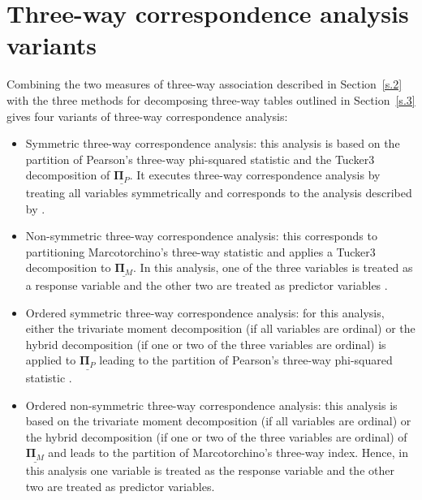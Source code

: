 \section{Three-way correspondence analysis variants}
\label{s.4}


Combining the two measures of three-way association described in Section~\ref{s.2} with the three methods for decomposing three-way tables outlined in Section~\ref{s.3} gives four variants of three-way correspondence analysis: 
\begin{itemize}
	\item Symmetric three-way correspondence analysis: this analysis is based on the partition of Pearson's three-way phi-squared statistic and the Tucker3 decomposition of $\underline{\bm{\Pi}_{P}}$. It executes three-way correspondence analysis by treating all variables symmetrically and corresponds to the analysis described by \cite{carkro96}. 
	\item Non-symmetric three-way correspondence analysis: this corresponds to partitioning Marcotorchino's three-way statistic and applies a Tucker3 decomposition to $\underline{\bm{\Pi}_{M}}$. In this analysis, one of the three variables is treated as a response variable and the other two are treated as predictor variables \citep{lom96}. 
	\item Ordered symmetric three-way correspondence analysis: for this analysis, either the trivariate moment decomposition (if all variables are ordinal) or the hybrid decomposition (if one or two of the three variables are ordinal) is applied to $\underline{\bm{\Pi}_{P}}$ leading to the partition of Pearson's three-way phi-squared statistic \citep{lombehkro21}. 
	\item Ordered non-symmetric three-way correspondence analysis: this analysis is based on the trivariate moment decomposition (if all variables are ordinal) or the hybrid decomposition (if one or two of the three variables are ordinal) of $\underline{\bm{\Pi}_{M}}$ and leads to the partition of Marcotorchino's three-way index. Hence, in this analysis one variable is treated as the response variable and the other two are treated as predictor variables.  
\end{itemize}

